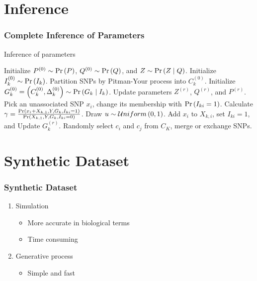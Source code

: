 \documentclass[xcolor=dvipsnames, professionalfont]{beamer}
\begin{document}
\section{Inference}
\begin{frame}
\frametitle{Complete Inference of Parameters}
\begin{algorithm}[H]
\small
\caption{Inference of parameters}
\label{alg:ParametersInference}
\begin{algorithmic}
\State Initialize $P^{(0)} \sim \Pr \left( P \right)$,
	$Q^{(0)} \sim \Pr \left( Q \right)$,
	and $Z \sim \Pr \left( Z \mid Q \right)$.
	\State Initialize $I_k^{(0)} \sim \Pr \left( I_k \right)$.
	\State Partition SNPs by Pitman-Your process into $C_k^{(0)}$.
	\State Initialize $G_k^{(0)} = \left( C_k^{(0)}, \Delta_k^{(0)} \right) \sim \Pr \left( G_k \mid I_k \right)$.
\EndFor
	\State Update parameters $Z^{(r)}$, $Q^{(r)}$, and $P^{(r)}$.
	\State Pick an unassociated SNP $x_i$, change its membership with $\Pr \left( I_{ki} = 1 \right)$.
	\State Calculate $\gamma = \frac{\Pr \left( x_i + X_{k, 1}, Y, G_k, I_{ki} = 1 \right)}{\Pr \left( X_{k, 1}, Y, G_k, I_{ki} = 0 \right)}$.
	\State Draw $u \sim \mathcal{U}niform \left( 0, 1 \right)$.
		\State Add $x_i$ to $X_{k, i}$, set $I_{ki} = 1$, and Update $G_k^{(r)}$.
	\EndIf
	\State Randomly select $c_i$ and $c_j$ from $C_K$, merge or exchange SNPs.
\EndFor
\end{algorithmic}
\end{algorithm}
\end{frame}



\section{Synthetic Dataset}
\begin{frame}
\frametitle{Synthetic Dataset}
\begin{enumerate}
\item Simulation
	\begin{itemize}
	\item More accurate in biological terms
	\item Time consuming
	\end{itemize}
\item Generative process
	\begin{itemize}
	\item Simple and fast
	\end{itemize}
\end{enumerate}
\end{frame}
\end{document}
